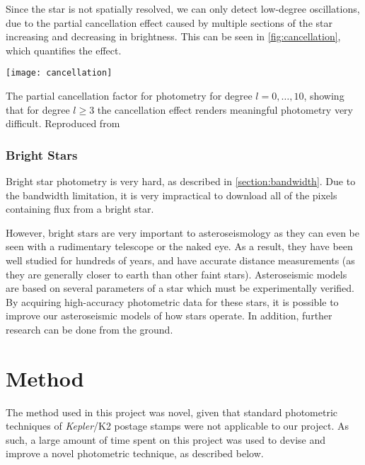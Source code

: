 \documentclass{book}
\begin{document}

Since the star is not spatially resolved, we can only detect low-degree
oscillations, due to the partial cancellation effect caused by multiple sections
of the star increasing and decreasing in brightness. This can be seen in
\autoref{fig:cancellation}, which quantifies the effect.

\begin{staticfigure}
	\centering
		\texttt{[image: cancellation]}
	\caption{The partial cancellation factor for photometry for degree $l = 0, \dots, 10$,
			 showing that for degree $l \ge 3$ the cancellation effect renders
			 meaningful photometry very difficult. Reproduced from \citet[Figure 1.5]{2010.ASTEROSEISMOLOGY}}
	\label{fig:cancellation}
\end{staticfigure}

\subsubsection{Bright Stars}

Bright star photometry is very hard, as described in \autoref{section:bandwidth}.
Due to the bandwidth limitation, it is very impractical to download all of the pixels
containing flux from a bright star.

However, bright stars are very important to asteroseismology as they can even be
seen with a rudimentary telescope or the naked eye. As a result, they have been
well studied for hundreds of years, and have accurate distance measurements (as
they are generally closer to earth than other faint stars). Asteroseismic models
are based on several parameters of a star which must be experimentally verified.
By acquiring high-accuracy photometric data for these stars, it is possible to
improve our asteroseismic models of how stars operate. In addition, further
research can be done from the ground.

\section{Method}

The method used in this project was novel, given that standard photometric
techniques of \textit{Kepler}/K2 postage stamps were not applicable to our project.
As such, a large amount of time spent on this project was used to devise and
improve a novel photometric technique, as described below.
\end{document}
